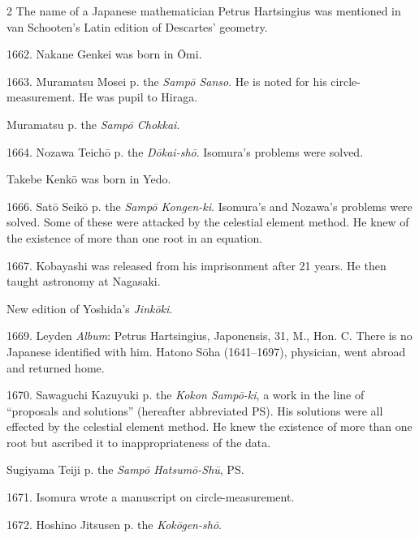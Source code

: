 \documentclass[11pt]{article}
\newcommand{\scanfooter}{}
\begin{document}
\begin{multicols}{2}
The name of a Japanese mathematician Petrus Hartsingius was mentioned in van Schooten's Latin edition of Descartes' geometry.

1662. Nakane Genkei was born in Ōmi.

1663. Muramatsu Mosei p. the \emph{Sampō Sanso}. He is noted for his circle-measurement. He was pupil to Hiraga.

Muramatsu p. the \emph{Sampō Chokkai}.

1664. Nozawa Teichō p. the \emph{Dōkai-shō}. Isomura's problems were solved.

Takebe Kenkō was born in Yedo.

1666. Satō Seikō p. the \emph{Sampō Kongen-ki}. Isomura's and Nozawa's problems were solved. Some of these were attacked by the celestial element method. He knew of the existence of more than one root in an equation.

1667. Kobayashi was released from his imprisonment after 21 years. He then taught astronomy at Nagasaki.

New edition of Yoshida's \emph{Jinkōki}.

1669. Leyden \emph{Album}: Petrus Hartsingius, Japonensis, 31, M., Hon. C. There is no Japanese identified with him. Hatono Sōha (1641--1697), physician, went abroad and returned home.

1670. Sawaguchi Kazuyuki p. the \emph{Kokon Sampō-ki}, a work in the line of ``proposals and solutions'' (hereafter abbreviated PS). His solutions were all effected by the celestial element method. He knew the existence of more than one root but ascribed it to inappropriateness of the data.

Sugiyama Teiji p. the \emph{Sampō Hatsumō-Shū}, PS.

1671. Isomura wrote a manuscript on circle-measurement.

1672. Hoshino Jitsusen p. the \emph{Kokōgen-shō}.
\end{multicols}
\scanfooter
\end{document}
